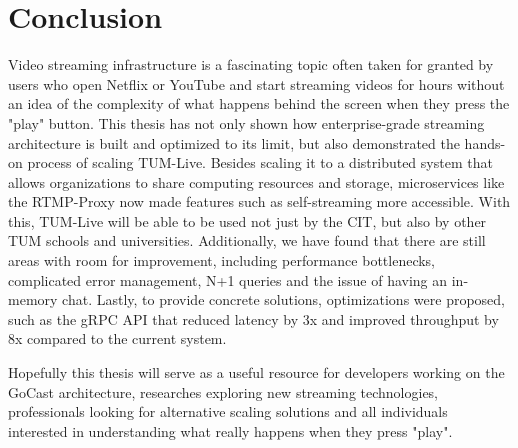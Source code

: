 
\chapter{Conclusion}\label{chapter:conclusion}

Video streaming infrastructure is a fascinating topic often taken for granted by users who open Netflix or YouTube and start streaming videos for hours without an idea of the complexity of what happens behind the screen when they press the "play" button. This thesis has not only shown how enterprise-grade streaming architecture is built and optimized to its limit, but also demonstrated the hands-on process of scaling TUM-Live. Besides scaling it to a distributed system that allows organizations to share computing resources and storage, microservices like the RTMP-Proxy now made features such as self-streaming more accessible. With this, TUM-Live will be able to be used not just by the \ac{CIT}, but also by other \ac{TUM} schools and universities.
Additionally, we have found that there are still areas with room for improvement, including performance bottlenecks, complicated error management, N+1 queries and the issue of having an in-memory chat. Lastly, to provide concrete solutions, optimizations were proposed, such as the \ac{gRPC} \ac{API} that reduced latency by 3x and improved throughput by 8x compared to the current system. 

Hopefully this thesis will serve as a useful resource for developers working on the GoCast architecture, researches exploring new streaming technologies, professionals looking for alternative scaling solutions and all individuals interested in understanding what really happens when they press "play".
